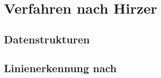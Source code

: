 \section{Verfahren nach Hirzer} %
\label{sec:hirzer}

\subsection{Datenstrukturen} %
\label{sub:datenstrukturen}








\subsection{Linienerkennung nach \citeauthor{clarke96}} %
\label{sub:linienerkennung_nach_clarke96}




